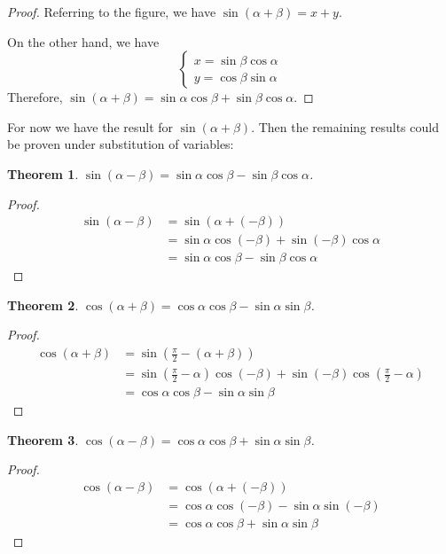 \documentclass[12pt]{article}
\newtheorem*{theorem}{Theorem}
\begin{document}
    \begin{proof}
        Referring to the figure, we have $\sin(\alpha+\beta)=x+y$.
        
        On the other hand, we have $$\begin{cases}
            x=\sin{\beta}\cos{\alpha}\\y=\cos{\beta}\sin{\alpha}
        \end{cases}$$ Therefore, $\sin(\alpha+\beta)=\sin{\alpha}\cos{\beta}+\sin{\beta}\cos{\alpha}$.
    \end{proof}

    For now we have the result for $\sin(\alpha+\beta)$. Then the remaining results could be proven under substitution of variables:
    
    \begin{theorem}
        $\sin(\alpha-\beta)=\sin{\alpha}\cos{\beta}-\sin{\beta}\cos{\alpha}$.
    \end{theorem}

    \begin{proof}
        \begin{align*}
            \sin(\alpha-\beta)&=\sin(\alpha+(-\beta))\\&=\sin{\alpha}\cos(-\beta)+\sin(-\beta)\cos{\alpha}\\&=\sin{\alpha}\cos{\beta}-\sin{\beta}\cos{\alpha}
        \end{align*}
    \end{proof}

    \begin{theorem}
        $\cos(\alpha+\beta)=\cos{\alpha}\cos{\beta}-\sin{\alpha}\sin{\beta}$.
    \end{theorem}

    \begin{proof}
        \begin{align*}
            \cos(\alpha+\beta)&=\sin(\frac{\pi}{2}-(\alpha+\beta))\\&=\sin(\frac{\pi}{2}-\alpha)\cos(-\beta)+\sin(-\beta)\cos(\frac{\pi}{2}-\alpha)\\&=\cos{\alpha}\cos{\beta}-\sin{\alpha}\sin{\beta}
        \end{align*}
    \end{proof}

    \begin{theorem}
        $\cos(\alpha-\beta)=\cos{\alpha}\cos{\beta}+\sin{\alpha}\sin{\beta}$.
    \end{theorem}

    \begin{proof}
        \begin{align*}
            \cos(\alpha-\beta)&=\cos(\alpha+(-\beta))\\&=\cos{\alpha}\cos(-\beta)-\sin{\alpha}\sin(-\beta)\\&=\cos{\alpha}\cos{\beta}+\sin{\alpha}\sin{\beta}
        \end{align*}
    \end{proof}
\end{document}
